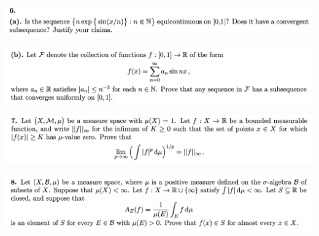 \newpage
\begin{mdframed}
\includegraphics[width=400pt]{img/analysis--berkeley-202a-final-f5b6.png}
\end{mdframed}

\begin{mdframed}
\includegraphics[width=400pt]{img/analysis--berkeley-202a-final-c7c7.png}
\end{mdframed}

\newpage
\begin{mdframed}
\includegraphics[width=400pt]{img/analysis--berkeley-202a-final-0000.png}
\end{mdframed}

\newpage
\begin{mdframed}
\includegraphics[width=400pt]{img/analysis--berkeley-202a-final-8aed.png}
\end{mdframed}
